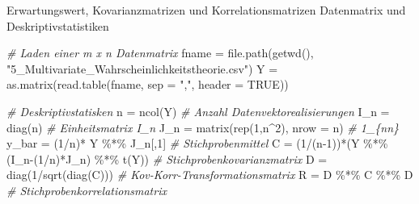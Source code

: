 \documentclass[
  8pt,
  ignorenonframetext,
]{beamer}
\newenvironment{Shaded}{\begin{snugshade}}{\end{snugshade}}
\newcommand{\AttributeTok}[1]{\textcolor[rgb]{0.77,0.63,0.00}{#1}}
\newcommand{\CommentTok}[1]{\textcolor[rgb]{0.56,0.35,0.01}{\textit{#1}}}
\newcommand{\ConstantTok}[1]{\textcolor[rgb]{0.00,0.00,0.00}{#1}}
\newcommand{\DecValTok}[1]{\textcolor[rgb]{0.00,0.00,0.81}{#1}}
\newcommand{\FunctionTok}[1]{\textcolor[rgb]{0.00,0.00,0.00}{#1}}
\newcommand{\NormalTok}[1]{#1}
\newcommand{\OtherTok}[1]{\textcolor[rgb]{0.56,0.35,0.01}{#1}}
\newcommand{\SpecialCharTok}[1]{\textcolor[rgb]{0.00,0.00,0.00}{#1}}
\newcommand{\StringTok}[1]{\textcolor[rgb]{0.31,0.60,0.02}{#1}}
\begin{document}
\begin{frame}[fragile]{Erwartungswert, Kovarianzmatrizen und
Korrelationsmatrizen}
\protect\hypertarget{erwartungswert-kovarianzmatrizen-und-korrelationsmatrizen-7}{}
Datenmatrix und Deskriptivstatistiken \vspace{2mm} 

\footnotesize

\begin{Shaded}
\begin{Highlighting}[]
\CommentTok{\# Laden einer m x n Datenmatrix}
\NormalTok{fname   }\OtherTok{=} \FunctionTok{file.path}\NormalTok{(}\FunctionTok{getwd}\NormalTok{(), }\StringTok{"5\_Multivariate\_Wahrscheinlichkeitstheorie.csv"}\NormalTok{)}
\NormalTok{Y       }\OtherTok{=} \FunctionTok{as.matrix}\NormalTok{(}\FunctionTok{read.table}\NormalTok{(fname, }\AttributeTok{sep =} \StringTok{","}\NormalTok{, }\AttributeTok{header =} \ConstantTok{TRUE}\NormalTok{)) }

\CommentTok{\# Deskriptivstatisken}
\NormalTok{n       }\OtherTok{=} \FunctionTok{ncol}\NormalTok{(Y)                                     }\CommentTok{\# Anzahl Datenvektorealisierungen}
\NormalTok{I\_n     }\OtherTok{=} \FunctionTok{diag}\NormalTok{(n)                                     }\CommentTok{\# Einheitsmatrix I\_n}
\NormalTok{J\_n     }\OtherTok{=} \FunctionTok{matrix}\NormalTok{(}\FunctionTok{rep}\NormalTok{(}\DecValTok{1}\NormalTok{,n}\SpecialCharTok{\^{}}\DecValTok{2}\NormalTok{), }\AttributeTok{nrow =}\NormalTok{ n)                }\CommentTok{\# 1\_\{nn\}}
\NormalTok{y\_bar   }\OtherTok{=}\NormalTok{ (}\DecValTok{1}\SpecialCharTok{/}\NormalTok{n)}\SpecialCharTok{*}\NormalTok{ Y }\SpecialCharTok{\%*\%}\NormalTok{ J\_n[,}\DecValTok{1}\NormalTok{]                        }\CommentTok{\# Stichprobenmittel}
\NormalTok{C       }\OtherTok{=}\NormalTok{ (}\DecValTok{1}\SpecialCharTok{/}\NormalTok{(n}\DecValTok{{-}1}\NormalTok{))}\SpecialCharTok{*}\NormalTok{(Y }\SpecialCharTok{\%*\%}\NormalTok{ (I\_n}\SpecialCharTok{{-}}\NormalTok{(}\DecValTok{1}\SpecialCharTok{/}\NormalTok{n)}\SpecialCharTok{*}\NormalTok{J\_n) }\SpecialCharTok{\%*\%} \FunctionTok{t}\NormalTok{(Y))  }\CommentTok{\# Stichprobenkovarianzmatrix}
\NormalTok{D       }\OtherTok{=} \FunctionTok{diag}\NormalTok{(}\DecValTok{1}\SpecialCharTok{/}\FunctionTok{sqrt}\NormalTok{(}\FunctionTok{diag}\NormalTok{(C)))                       }\CommentTok{\# Kov{-}Korr{-}Transformationsmatrix}
\NormalTok{R       }\OtherTok{=}\NormalTok{ D }\SpecialCharTok{\%*\%}\NormalTok{ C }\SpecialCharTok{\%*\%}\NormalTok{ D                               }\CommentTok{\# Stichprobenkorrelationsmatrix}
\end{Highlighting}
\end{Shaded}
\end{frame}
\end{document}
